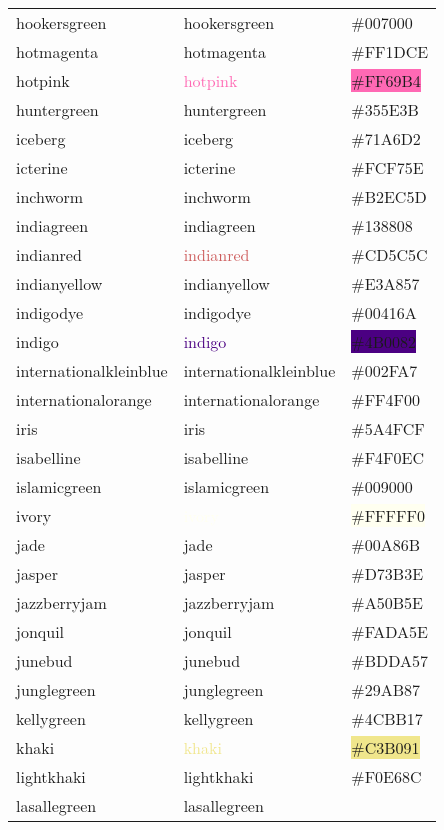 \documentclass[
]{article}
\begin{document}
\begin{longtable}[]{@{}lll@{}}
hookersgreen & \textcolor{hookersgreen}{hookersgreen} &
\colorbox{hookersgreen}{\#007000}\tabularnewline
hotmagenta & \textcolor{hotmagenta}{hotmagenta} &
\colorbox{hotmagenta}{\#FF1DCE}\tabularnewline
hotpink & \textcolor{hotpink}{hotpink} &
\colorbox{hotpink}{\#FF69B4}\tabularnewline
huntergreen & \textcolor{huntergreen}{huntergreen} &
\colorbox{huntergreen}{\#355E3B}\tabularnewline
iceberg & \textcolor{iceberg}{iceberg} &
\colorbox{iceberg}{\#71A6D2}\tabularnewline
icterine & \textcolor{icterine}{icterine} &
\colorbox{icterine}{\#FCF75E}\tabularnewline
inchworm & \textcolor{inchworm}{inchworm} &
\colorbox{inchworm}{\#B2EC5D}\tabularnewline
indiagreen & \textcolor{indiagreen}{indiagreen} &
\colorbox{indiagreen}{\#138808}\tabularnewline
indianred & \textcolor{indianred}{indianred} &
\colorbox{chestnut}{\#CD5C5C}\tabularnewline
indianyellow & \textcolor{indianyellow}{indianyellow} &
\colorbox{indianyellow}{\#E3A857}\tabularnewline
indigodye & \textcolor{indigodye}{indigodye} &
\colorbox{indigodye}{\#00416A}\tabularnewline
indigo & \textcolor{indigo}{indigo} &
\colorbox{indigo}{\#4B0082}\tabularnewline
internationalkleinblue &
\textcolor{internationalkleinblue}{internationalkleinblue} &
\colorbox{internationalkleinblue}{\#002FA7}\tabularnewline
internationalorange &
\textcolor{internationalorange}{internationalorange} &
\colorbox{internationalorange}{\#FF4F00}\tabularnewline
iris & \textcolor{iris}{iris} & \colorbox{iris}{\#5A4FCF}\tabularnewline
isabelline & \textcolor{isabelline}{isabelline} &
\colorbox{isabelline}{\#F4F0EC}\tabularnewline
islamicgreen & \textcolor{islamicgreen}{islamicgreen} &
\colorbox{islamicgreen}{\#009000}\tabularnewline
ivory & \textcolor{ivory}{ivory} &
\colorbox{ivory}{\#FFFFF0}\tabularnewline
jade & \textcolor{jade}{jade} & \colorbox{jade}{\#00A86B}\tabularnewline
jasper & \textcolor{jasper}{jasper} &
\colorbox{jasper}{\#D73B3E}\tabularnewline
jazzberryjam & \textcolor{jazzberryjam}{jazzberryjam} &
\colorbox{jazzberryjam}{\#A50B5E}\tabularnewline
jonquil & \textcolor{jonquil}{jonquil} &
\colorbox{jonquil}{\#FADA5E}\tabularnewline
junebud & \textcolor{junebud}{junebud} &
\colorbox{junebud}{\#BDDA57}\tabularnewline
junglegreen & \textcolor{junglegreen}{junglegreen} &
\colorbox{junglegreen}{\#29AB87}\tabularnewline
kellygreen & \textcolor{kellygreen}{kellygreen} &
\colorbox{kellygreen}{\#4CBB17}\tabularnewline
khaki & \textcolor{khaki}{khaki} &
\colorbox{khaki}{\#C3B091}\tabularnewline
lightkhaki & \textcolor{lightkhaki}{lightkhaki} &
\colorbox{lightkhaki}{\#F0E68C}\tabularnewline
lasallegreen & \textcolor{lasallegreen}{lasallegreen} &

\end{longtable}
\end{document}
